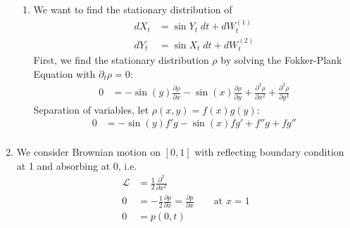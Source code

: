 \documentclass[12pt]{article}
\theoremstyle{plain}
\theoremstyle{definition}
\theoremstyle{remark}
\begin{document}
\begin{enumerate}
\begin{enumerate}
      \item %
        We want to find the stationary distribution of
        \begin{align*}
          dX_t &= \sin Y_t \; dt + dW_t^{(1)} \\
          dY_t &= \sin X_t \; dt + dW_t^{(2)}
        \end{align*}
        First, we find the stationary distribution $\rho$ by solving the
        Fokker-Plank Equation with $\partial_t \rho=0$:
        \begin{align*}
          0 &=
          - \sin(y) \frac{\partial \rho}{\partial x}
          - \sin(x) \frac{\partial \rho}{\partial y}
          + \frac{\partial^2 \rho}{\partial x^2}
          + \frac{\partial^2 \rho}{\partial y^2}
        \end{align*}
        Separation of variables, let $\rho(x,y) = f(x) g(y)$:
        \begin{align*}
          0 &=
          - \sin(y) f' g
          - \sin(x) f g'
          + f'' g
          + f g''\\
        \end{align*}

    \end{enumerate}

  \item %
    We consider Brownian motion on $[0,1]$ with reflecting boundary
    condition at 1 and absorbing at 0, i.e.
    \begin{align*}
      \mathscr{L} &= \frac{1}{2} \frac{\partial^2}{\partial x^2}\\
      0
      &= -\frac{1}{2} \frac{\partial p}{\partial x}
      = \frac{\partial p}{\partial x}
      \qquad \text{at $x=1$}\\
      0 &= p(0,t)
    \end{align*}


\end{enumerate}
\end{document}
